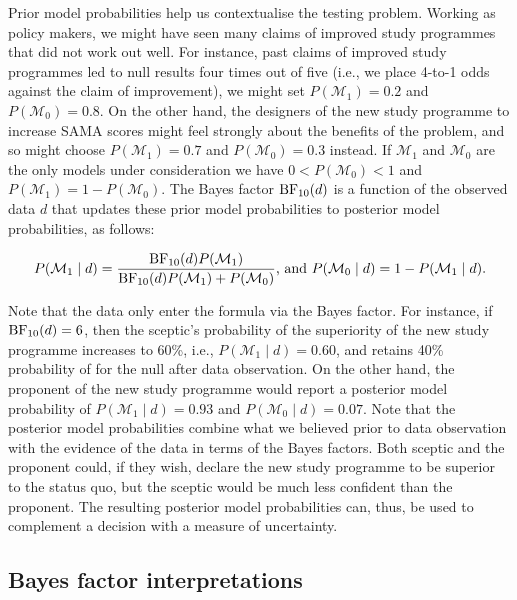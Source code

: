 \documentclass[english,,doc,floatsintext]{apa6}
\begin{document}
Prior model probabilities help us contextualise the testing problem. Working as policy makers, we might have seen many claims of improved study programmes that did not work out well. For instance, past claims of improved study programmes led to null results four times out of five (i.e., we place 4-to-1 odds against the claim of improvement), we might set \(P( \mathcal{M}_{1}) = 0.2\) and \(P(\mathcal{M}_{0}) = 0.8\). On the other hand, the designers of the new study programme to increase SAMA scores might feel strongly about the benefits of the problem, and so might choose \(P( \mathcal{M}_{1}) = 0.7\) and \(P(\mathcal{M}_{0}) = 0.3\) instead. If \(\mathcal{M}_{1}\) and \(\mathcal{M}_{0}\) are the only models under consideration we have \(0 < P( \mathcal{M}_{0}) < 1\) and \(P( \mathcal{M}_{1})= 1 - P( \mathcal{M}_{0})\). The Bayes factor \(\textnormal{BF}_{10}(d)\) is a function of the observed data \(d\) that updates these prior model probabilities to posterior model probabilities, as follows:

\begin{align}
\label{eqPriorToPosterior}
P(\mathcal{M}_{1} \mid d) = \frac{ \textnormal{BF}_{10}(d) P(\mathcal{M}_{1})}{\textnormal{BF}_{10}(d) P(\mathcal{M}_{1}) + P(\mathcal{M}_{0})} \text{, and } P(\mathcal{M}_{0} \mid d) = 1 - P(\mathcal{M}_{1} \mid d). 
\end{align}

Note that the data only enter the formula via the Bayes factor. For instance, if \(\textnormal{BF}_{10}(d) = 6\), then the sceptic's probability of the superiority of the new study programme increases to 60\%, i.e., \(P(\mathcal{M}_{1} \mid d)=0.60\), and retains 40\% probability of for the null after data observation. On the other hand, the proponent of the new study programme would report a posterior model probability of \(P(\mathcal{M}_{1} \mid d)=0.93\) and \(P(\mathcal{M}_{0} \mid d)=0.07\). Note that the posterior model probabilities combine what we believed prior to data observation with the evidence of the data in terms of the Bayes factors. Both sceptic and the proponent could, if they wish, declare the new study programme to be superior to the status quo, but the sceptic would be much less confident than the proponent. The resulting posterior model probabilities can, thus, be used to complement a decision with a measure of uncertainty.

\hypertarget{bayes-factor-interpretations}{%
\subsection{Bayes factor interpretations}\label{bayes-factor-interpretations}}
\end{document}
